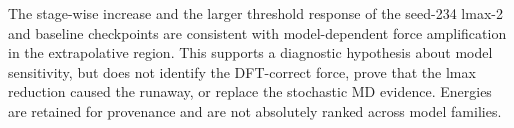 The stage-wise increase and the larger threshold response of the seed-234 lmax-2 and baseline checkpoints are consistent with model-dependent force amplification in the extrapolative region. This supports a diagnostic hypothesis about model sensitivity, but does not identify the DFT-correct force, prove that the lmax reduction caused the runaway, or replace the stochastic MD evidence. Energies are retained for provenance and are not absolutely ranked across model families.
